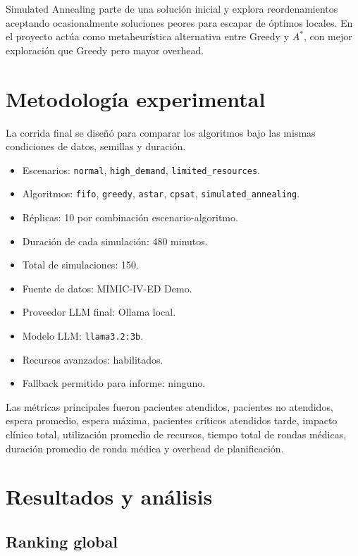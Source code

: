\documentclass[12pt,a4paper]{article}
\begin{document}
Simulated Annealing parte de una solución inicial y explora reordenamientos aceptando ocasionalmente soluciones peores para escapar de óptimos locales. En el proyecto actúa como metaheurística alternativa entre Greedy y $A^*$, con mejor exploración que Greedy pero mayor overhead.

\section{Metodología experimental}

La corrida final se diseñó para comparar los algoritmos bajo las mismas condiciones de datos, semillas y duración.

\begin{itemize}
    \item Escenarios: \texttt{normal}, \texttt{high\_demand}, \texttt{limited\_resources}.
    \item Algoritmos: \texttt{fifo}, \texttt{greedy}, \texttt{astar}, \texttt{cpsat}, \texttt{simulated\_annealing}.
    \item Réplicas: 10 por combinación escenario-algoritmo.
    \item Duración de cada simulación: 480 minutos.
    \item Total de simulaciones: 150.
    \item Fuente de datos: MIMIC-IV-ED Demo.
    \item Proveedor LLM final: Ollama local.
    \item Modelo LLM: \texttt{llama3.2:3b}.
    \item Recursos avanzados: habilitados.
    \item Fallback permitido para informe: ninguno.
\end{itemize}

Las métricas principales fueron pacientes atendidos, pacientes no atendidos, espera promedio, espera máxima, pacientes críticos atendidos tarde, impacto clínico total, utilización promedio de recursos, tiempo total de rondas médicas, duración promedio de ronda médica y overhead de planificación.

\section{Resultados y análisis}

\subsection{Ranking global}
\end{document}
